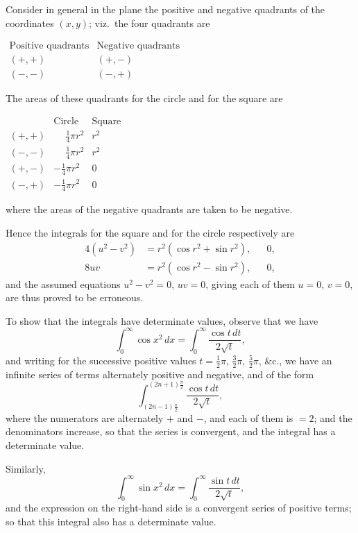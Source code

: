 \documentclass[11pt,a4paper]{article}
\theoremstyle{plain}
\theoremstyle{definition}
\theoremstyle{remark}
\begin{document}
Consider in general in the plane the positive and negative quadrants of the coordinates $(x,y)$; viz.\ the four quadrants are
\begin{center}
$\begin{array}{c|c}
\text{Positive quadrants} & \text{Negative quadrants} \\
\hline
(+,+) & (+,-) \\
(-,-) & (-,+)
\end{array}$
\end{center}

\newpage

The areas of these quadrants for the circle and for the square are
\begin{center}
$\begin{array}{c|cc}
& \text{Circle} & \text{Square} \\
\hline
(+,+) & \phantom{-}\frac{1}{4}\pi r^2 & r^2 \\
(-,-) & \phantom{-}\frac{1}{4}\pi r^2 & r^2 \\
(+,-) & -\frac{1}{4}\pi r^2 & 0 \\
(-,+) & -\frac{1}{4}\pi r^2 & 0
\end{array}$
\end{center}
where the areas of the negative quadrants are taken to be negative.

Hence the integrals for the square and for the circle respectively are
\begin{align*}
4(u^2 - v^2) &= r^2(\cos r^2 + \sin r^2), & &0, \\
8uv &= r^2(\cos r^2 - \sin r^2), & &0,
\end{align*}
and the assumed equations $u^2 - v^2 = 0$, $uv = 0$, giving each of them $u = 0$, $v = 0$, are thus proved to be erroneous.

\newpage

To show that the integrals have determinate values, observe that we have
\[
\int_0^{\infty} \cos x^2\,dx = \int_0^{\infty} \frac{\cos t\,dt}{2\sqrt{t}},
\]
and writing for the successive positive values $t = \frac{1}{2}\pi$, $\frac{3}{2}\pi$, $\frac{5}{2}\pi$, \&c., we have an infinite series of terms alternately positive and negative, and of the form
\[
\int_{(2n-1)\frac{\pi}{2}}^{(2n+1)\frac{\pi}{2}} \frac{\cos t\,dt}{2\sqrt{t}},
\]
where the numerators are alternately $+$ and $-$, and each of them is $=2$; and the denominators increase, so that the series is convergent, and the integral has a determinate value.

Similarly,
\[
\int_0^{\infty} \sin x^2\,dx = \int_0^{\infty} \frac{\sin t\,dt}{2\sqrt{t}},
\]
and the expression on the right-hand side is a convergent series of positive terms; so that this integral also has a determinate value.
\end{document}
